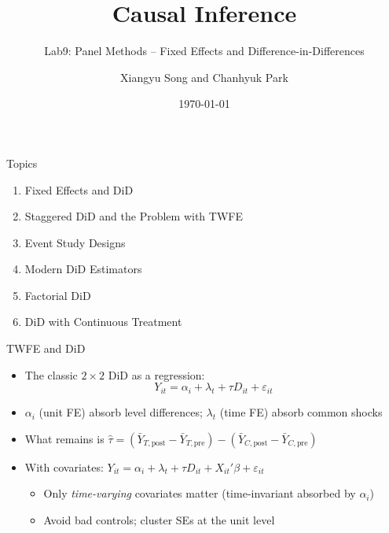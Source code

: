 \documentclass[10pt, handout]{beamer}
\title[Causal Lab]{Causal Inference}
\subtitle{Lab9: Panel Methods -- Fixed Effects and Difference-in-Differences}
\author[Song and Park]{Xiangyu Song and Chanhyuk Park}
\institute{Washington University in St. Louis}
\date{\today}
\begin{document}
\maketitle

\begin{frame}{Topics}
  \begin{enumerate}
    \item Fixed Effects and DiD
    \vspace{0.3cm}
    \item Staggered DiD and the Problem with TWFE
    \vspace{0.3cm}
    \item Event Study Designs
    \vspace{0.3cm}
    \item Modern DiD Estimators
    \vspace{0.3cm}
    \item Factorial DiD
    \vspace{0.3cm}
    \item DiD with Continuous Treatment
    \vspace{0.3cm}

  \end{enumerate}
\end{frame}


\begin{frame}{TWFE and DiD}
  \begin{itemize}
    \item The classic $2 \times 2$ DiD as a regression:
      $$
        Y_{it} = \alpha_i + \lambda_t + \tau D_{it} + \varepsilon_{it}
      $$
    \item $\alpha_i$ (unit FE) absorb level differences; $\lambda_t$ (time FE) absorb common shocks
    \item What remains is $\hat{\tau} = (\bar{Y}_{T,\text{post}} - \bar{Y}_{T,\text{pre}}) - (\bar{Y}_{C,\text{post}} - \bar{Y}_{C,\text{pre}})$
    \item With covariates: $Y_{it} = \alpha_i + \lambda_t + \tau D_{it} + X_{it}'\beta + \varepsilon_{it}$
      \begin{itemize}
        \item Only \textit{time-varying} covariates matter (time-invariant absorbed by $\alpha_i$)
        \item Avoid bad controls; cluster SEs at the unit level
      \end{itemize}
  \end{itemize}
\end{frame}
\end{document}

